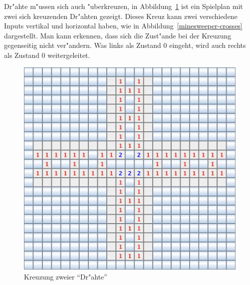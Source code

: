 Dr"ahte m"ussen sich auch "uberkreuzen, in Abbildung~\ref{minesweeper-cross}
ist ein Spielplan mit zwei sich kreuzenden Dr"ahten gezeigt. Dieses
Kreuz kann zwei verschiedene Inputs vertikal und horizontal haben,
wie in Abbildung~\ref{minesweeper-crosses} dargestellt. Man kann
erkennen, dass sich die Zust"ande bei der Kreuzung gegenseitig nicht
ver"andern. Was links als Zustand 0 eingeht, wird auch rechts als Zustand
0 weitergeleitet.
\begin{figure}
\begin{center}
\includegraphics[width=0.6\hsize]{graphics/cross}
\end{center}
\caption{Kreuzung zweier ``Dr"ahte''\label{minesweeper-cross}}
\end{figure}%
